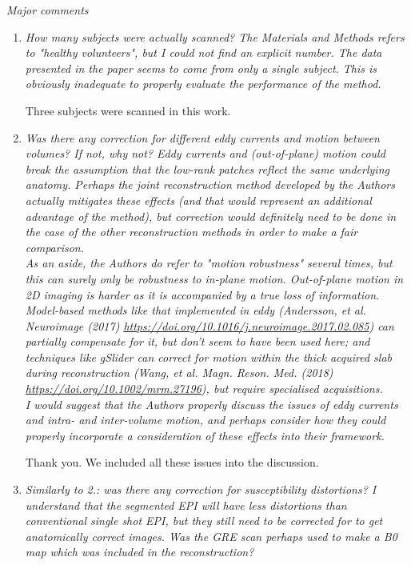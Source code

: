 \documentclass[a4paper,11pt,twoside]{report}
\begin{document}
\vspace{1em}

\noindent \textit{Major comments}

\begin{enumerate}
    \item \textit{How many subjects were actually scanned? The Materials and Methods refers to "healthy volunteers", but I could not find an explicit number. The data presented in the paper seems to come from only a single subject. This is obviously inadequate to properly evaluate the performance of the method.}

    \hspace{1em} Three subjects were scanned in this work.

    \item \textit{Was there any correction for different eddy currents and motion between volumes? If not, why not? Eddy currents and (out-of-plane) motion could break the assumption that the low-rank patches reflect the same underlying anatomy. Perhaps the joint reconstruction method developed by the Authors actually mitigates these effects (and that would represent an additional advantage of the method), but correction would definitely need to be done in the case of the other reconstruction methods in order to make a fair comparison.\\
    As an aside, the Authors do refer to "motion robustness" several times, but this can surely only be robustness to in-plane motion. Out-of-plane motion in 2D imaging is harder as it is accompanied by a true loss of information. Model-based methods like that implemented in eddy (Andersson, et al. Neuroimage (2017) \url{https://doi.org/10.1016/j.neuroimage.2017.02.085}) can partially compensate for it, but don't seem to have been used here; and techniques like gSlider can correct for motion within the thick acquired slab during reconstruction (Wang, et al. Magn. Reson. Med. (2018) \url{https://doi.org/10.1002/mrm.27196}), but require specialised acquisitions.\\
    I would suggest that the Authors properly discuss the issues of eddy currents and intra- and inter-volume motion, and perhaps consider how they could properly incorporate a consideration of these effects into their framework.}

    \hspace{1em} Thank you. We included all these issues into the discussion.

    \item \textit{Similarly to 2.: was there any correction for susceptibility distortions? I understand that the segmented EPI will have less distortions than conventional single shot EPI, but they still need to be corrected for to get anatomically correct images. Was the GRE scan perhaps used to make a B0 map which was included in the reconstruction?}


\end{enumerate}
\end{document}
